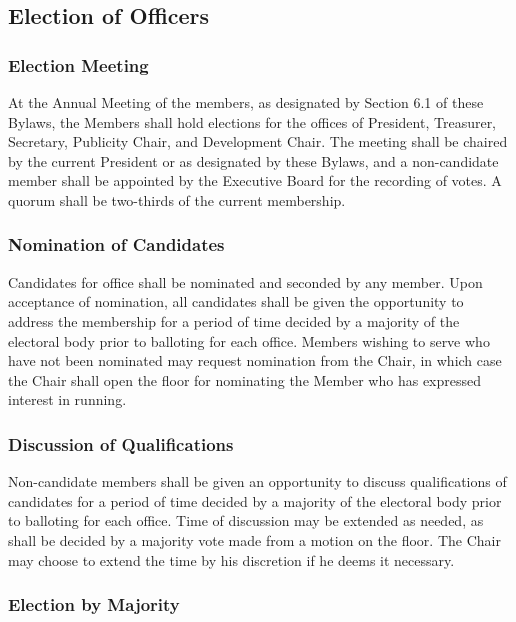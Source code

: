 \documentclass{article}
\begin{document}
\subsection{Election of Officers}

\subsubsection{Election Meeting}

At the Annual Meeting of the members, as designated by Section 6.1
of these Bylaws, the Members shall hold elections for the offices
of President, Treasurer, Secretary, Publicity Chair, and Development
Chair. The meeting shall be chaired by the current President or as
designated by these Bylaws, and a non-candidate member shall be appointed
by the Executive Board for the recording of votes. A quorum shall
be two-thirds of the current membership.

\subsubsection{Nomination of Candidates}

Candidates for office shall be nominated and seconded by any member.
Upon acceptance of nomination, all candidates shall be given the opportunity
to address the membership for a period of time decided by a majority
of the electoral body prior to balloting for each office. Members
wishing to serve who have not been nominated may request nomination
from the Chair, in which case the Chair shall open the floor for nominating
the Member who has expressed interest in running.

\subsubsection{Discussion of Qualifications}

Non-candidate members shall be given an opportunity to discuss qualifications
of candidates for a period of time decided by a majority of the electoral
body prior to balloting for each office. Time of discussion may be
extended as needed, as shall be decided by a majority vote made from
a motion on the floor. The Chair may choose to extend the time by
his discretion if he deems it necessary.

\subsubsection{Election by Majority}
\end{document}

